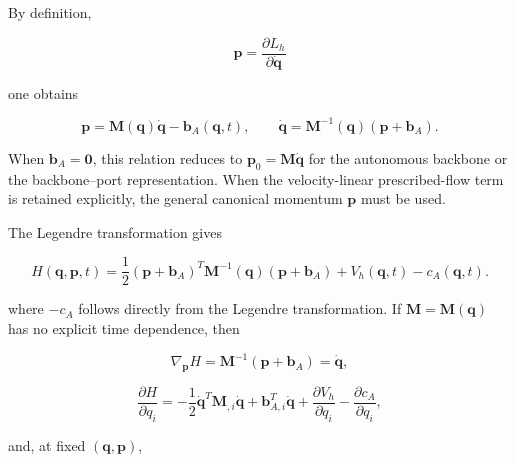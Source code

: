 By definition,

\begin{equation}
\label{eq:hamiltonian-3-43}
\mathbf{p} = \frac{\partial L_{h}}{\partial\dot{\mathbf{q}}}
\end{equation}

one obtains

\begin{equation}
\label{eq:hamiltonian-3-44}
\boxed{\mathbf{p} = \mathbf{M}\left( \mathbf{q} \right)\dot{\mathbf{q}} - \mathbf{b}_{A}\left( \mathbf{q},t \right),\quad\quad\dot{\mathbf{q}} = \mathbf{M}^{- 1}\left( \mathbf{q} \right)\left( \mathbf{p} + \mathbf{b}_{A} \right).}
\end{equation}

When \(\mathbf{b}_{A}=\mathbf{0}\), this relation reduces to \(\mathbf{p}_{0}=\mathbf{M}\dot{\mathbf{q}}\) for the autonomous backbone or the backbone--port representation. When the velocity-linear prescribed-flow term is retained explicitly, the general canonical momentum \(\mathbf{p}\) must be used.

The Legendre transformation gives

\begin{equation}
\label{eq:hamiltonian-3-45}
\boxed{H\left( \mathbf{q},\mathbf{p},t \right) = \frac{1}{2}\left( \mathbf{p} + \mathbf{b}_{A} \right)^{T}\mathbf{M}^{- 1}\left( \mathbf{q} \right)\left( \mathbf{p} + \mathbf{b}_{A} \right) + V_{h}\left( \mathbf{q},t \right) - c_{A}\left( \mathbf{q},t \right).}
\end{equation}

where \(-c_{A}\) follows directly from the Legendre transformation. If \(\mathbf{M} = \mathbf{M}\left( \mathbf{q} \right)\) has no explicit time dependence, then

\begin{equation}
\label{eq:hamiltonian-3-46}
\boxed{\nabla_{\mathbf{p}}H = \mathbf{M}^{- 1}\left( \mathbf{p} + \mathbf{b}_{A} \right) = \dot{\mathbf{q}},}
\end{equation}

\begin{equation}
\label{eq:hamiltonian-3-47}
\boxed{\frac{\partial H}{\partial q_{i}} = - \frac{1}{2}{\dot{\mathbf{q}}}^{T}\mathbf{M}_{,i}\dot{\mathbf{q}} + \mathbf{b}_{A,i}^{T}\dot{\mathbf{q}} + \frac{\partial V_{h}}{\partial q_{i}} - \frac{\partial c_{A}}{\partial q_{i}},}
\end{equation}

and, at fixed \(\left(\mathbf{q},\mathbf{p}\right)\),

